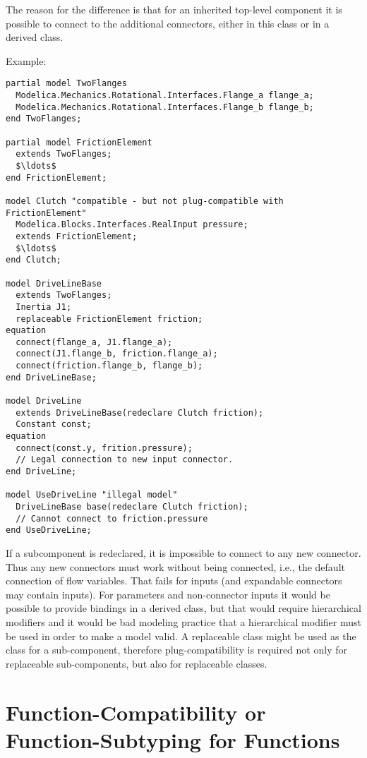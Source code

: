 \begin{nonnormative}
The reason for the difference is that for an inherited
top-level component it is possible to connect to the additional
connectors, either in this class or in a derived class.

Example:
\begin{lstlisting}[language=modelica]
partial model TwoFlanges
  Modelica.Mechanics.Rotational.Interfaces.Flange_a flange_a;
  Modelica.Mechanics.Rotational.Interfaces.Flange_b flange_b;
end TwoFlanges;

partial model FrictionElement
  extends TwoFlanges;
  $\ldots$
end FrictionElement;

model Clutch "compatible - but not plug-compatible with FrictionElement"
  Modelica.Blocks.Interfaces.RealInput pressure;
  extends FrictionElement;
  $\ldots$
end Clutch;

model DriveLineBase
  extends TwoFlanges;
  Inertia J1;
  replaceable FrictionElement friction;
equation
  connect(flange_a, J1.flange_a);
  connect(J1.flange_b, friction.flange_a);
  connect(friction.flange_b, flange_b);
end DriveLineBase;

model DriveLine
  extends DriveLineBase(redeclare Clutch friction);
  Constant const;
equation
  connect(const.y, frition.pressure);
  // Legal connection to new input connector.
end DriveLine;

model UseDriveLine "illegal model"
  DriveLineBase base(redeclare Clutch friction);
  // Cannot connect to friction.pressure
end UseDriveLine;
\end{lstlisting}

If a subcomponent is redeclared, it is impossible to connect to any new connector.  Thus any new connectors must work without being connected, i.e., the default connection of flow variables.  That fails for inputs (and expandable connectors may contain inputs).  For parameters and non-connector inputs it would be possible to provide bindings in a derived class, but that would require hierarchical modifiers and it would be bad modeling practice that a hierarchical modifier must be used in order to make a model valid.  A replaceable class might be used as the class for a sub-component, therefore plug-compatibility is required not only for replaceable sub-components, but also for replaceable classes.
\end{nonnormative}

\section{Function-Compatibility or Function-Subtyping for Functions}\label{function-compatibility-or-function-subtyping-for-functions}

